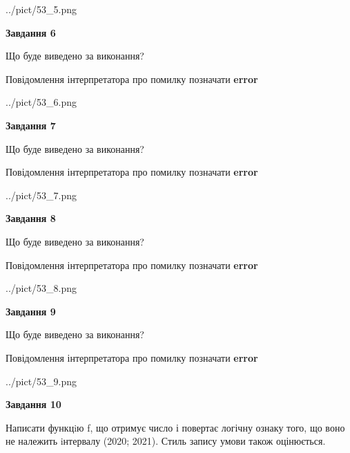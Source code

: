 \documentclass[12pt, ukrainian]{article}
\begin{document}
{\begin {large}
\begin{center}
	{../pict/53_5.png}
\end{center}
\newpage

{\begin {center}\textbf{Завдання 6}\end {center}}\par
Що буде виведено за виконання? \par
Повідомлення інтерпретатора про помилку позначати \textbf{error}

\begin{center}
	{../pict/53_6.png}
\end{center}
\newpage

{\begin {center}\textbf{Завдання 7}\end {center}}\par
Що буде виведено за виконання? \par
Повідомлення інтерпретатора про помилку позначати \textbf{error}

\begin{center}
	{../pict/53_7.png}
\end{center}
\newpage

{\begin {center}\textbf{Завдання 8}\end {center}}\par
Що буде виведено за виконання? \par
Повідомлення інтерпретатора про помилку позначати \textbf{error}

\begin{center}
	{../pict/53_8.png}
\end{center}
\newpage

{\begin {center}\textbf{Завдання 9}\end {center}}\par
Що буде виведено за виконання? \par
Повідомлення інтерпретатора про помилку позначати \textbf{error}

\begin{center}
	{../pict/53_9.png}
\end{center}
\newpage

{\begin {center}\textbf{Завдання 10}\end {center}}\par

Написати функцiю f, що отримує число і повертає логічну ознаку того, що воно не належить iнтервалу (2020; 2021). Стиль запису умови також оцінюється.\par
\newpage

\end {large}}
\end{document}
